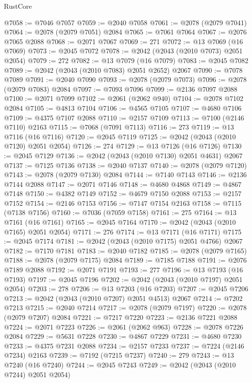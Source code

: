 \begin{lexlean}{RustCore}
\begin{coremodule}
@7058 := @7046 @7057
@7059 := @2040 @7058
@7061 := @2078 (@2079 @7041)
@7064 := @2078 (@2079 @7051) @2084
@7065 := @7061 @7064
@7067 := @2076 @7065 @2088
@7068 := @2071 @7067
@7069 := 271
@7072 := @13 @7069 (@16 @7069)
@7073 := @2045 @7072
@7078 := @2042 (@2043 (@2010 @7073) @2051 @2054)
@7079 := 272
@7082 := @13 @7079 (@16 @7079)
@7083 := @2045 @7082
@7089 := @2042 (@2043 (@2010 @7083) @2051 @2652) @2067
@7090 := @7078 @7089
@7091 := @2040 @7090
@7093 := @2078 (@2079 @7073)
@7096 := @2078 (@2079 @7083) @2084
@7097 := @7093 @7096
@7099 := @2136 @7097 @2088
@7100 := @2071 @7099
@7102 := @2061 (@2062 @940)
@7104 := @2078 @7102 @2084
@7105 := @4813 @7104
@7106 := @4565 @7105
@7107 := @4680 @7106
@7109 := @4375 @7107 @2088
@7110 := @2157 @7109
@7113 := @7100 (@2146 @7110) @2163
@7115 := @7068 (@7091 @7113)
@7116 := 273
@7119 := @13 @7116 (@16 @7116)
@7120 := @2045 @7119
@7125 := @2042 (@2043 (@2010 @7120) @2051 @2054)
@7126 := 274
@7129 := @13 @7126 (@16 @7126)
@7130 := @2045 @7129
@7136 := @2042 (@2043 (@2010 @7130) @2051 @4631) @2067
@7137 := @7125 @7136
@7138 := @2040 @7137
@7140 := @2078 (@2079 @7120)
@7143 := @2078 (@2079 @7130) @2084
@7144 := @7140 @7143
@7146 := @2136 @7144 @2088
@7147 := @2071 @7146
@7148 := @4680 @4868
@7149 := @4867 @7148
@7150 := @4382 @7149
@7152 := @4679 @7150 @2088
@7153 := @2157 @7152
@7154 := @2146 @7153
@7156 := @7147 @7154 @2163
@7158 := @7115 (@7138 @7156)
@7160 := @7036 (@7059 @7158)
@7161 := 275
@7164 := @13 @7161 (@16 @7161)
@7165 := @2045 @7164
@7170 := @2042 (@2043 (@2010 @7165) @2051 @2054)
@7171 := 276
@7174 := @13 @7171 (@16 @7171)
@7175 := @2045 @7174
@7181 := @2042 (@2043 (@2010 @7175) @2051 @4766) @2067
@7182 := @7170 @7181
@7183 := @2040 @7182
@7185 := @2078 (@2079 @7165)
@7188 := @2078 (@2079 @7175) @2084
@7189 := @7185 @7188
@7191 := @2076 @7189 @2088
@7192 := @2071 @7191
@7193 := 277
@7196 := @13 @7193 (@16 @7193)
@7197 := @2045 @7196
@7202 := @2042 (@2043 (@2010 @7197) @2051 @2054)
@7203 := 278
@7206 := @13 @7203 (@16 @7203)
@7207 := @2045 @7206
@7213 := @2042 (@2043 (@2010 @7207) @2051 @4513) @2067
@7214 := @7202 @7213
@7215 := @2040 @7214
@7217 := @2078 (@2079 @7197)
@7220 := @2078 (@2079 @7207) @2084
@7221 := @7217 @7220
@7223 := @2136 @7221 @2088
@7224 := @2071 @7223
@7226 := @2061 (@2062 @963)
@7228 := @2078 @7226 @2084
@7229 := @5631 @7228
@7230 := @4867 @7229
@7231 := @4680 @7230
@7233 := @4375 @7231 @2088
@7234 := @2157 @7233
@7237 := @7224 (@2146 @7234) @2163
@7239 := @7192 (@7215 @7237)
@7240 := 279
@7243 := @13 @7240 (@16 @7240)
@7244 := @2045 @7243
@7249 := @2042 (@2043 (@2010 @7244) @2051 @2054)

\end{coremodule}
\end{lexlean}
